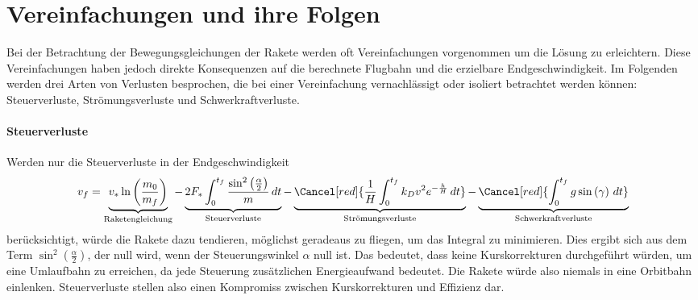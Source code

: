 %
%
%
%

\section{Vereinfachungen und ihre Folgen 
	\label{leo:section:vereinfachungen}}

Bei der Betrachtung der Bewegungsgleichungen der Rakete werden oft Vereinfachungen vorgenommen um die Lösung zu erleichtern. 
Diese Vereinfachungen haben jedoch direkte Konsequenzen auf die berechnete Flugbahn und die erzielbare Endgeschwindigkeit. 
Im Folgenden werden drei Arten von Verlusten besprochen, die bei einer Vereinfachung vernachlässigt oder isoliert betrachtet werden können: Steuerverluste, Strömungsverluste und Schwerkraftverluste.


\paragraph{Steuerverluste} Werden nur die Steuerverluste in der Endgeschwindigkeit
\begin{equation*}
	v_f = \underbrace{v_* \ln \left(\frac{m_0}{m_f}\right)}_{\text{Raketengleichung}} 
	- \underbrace{2F_* \int_0^{t_f} \frac{\sin^2\left(\frac{\alpha}{2}\right)}{m} \, dt }_{\text{Steuerverluste}}
	- \underbrace{\Cancel[red]{\frac{1}{H} \int_0^{t_f} k_Dv^2 e^{-\frac{h}{H}} \, dt }}_{\text{Strömungsverluste}}
	- \underbrace{\Cancel[red]{\int_0^{t_f} g \sin \left(\gamma\right) \, dt}}_{\text{Schwerkraftverluste}}
\end{equation*}
berücksichtigt, würde die Rakete dazu tendieren, möglichst geradeaus zu fliegen, um das Integral zu minimieren. 
Dies ergibt sich aus dem Term $\sin^2\left( \frac{\alpha}{2}\right)$, der null wird, wenn der Steuerungswinkel $\alpha$ null ist. 
Das bedeutet, dass keine Kurskorrekturen durchgeführt würden, um eine Umlaufbahn zu erreichen, da jede Steuerung zusätzlichen Energieaufwand bedeutet. 
Die Rakete würde also niemals in eine Orbitbahn einlenken.
Steuerverluste stellen also einen Kompromiss zwischen Kurskorrekturen und Effizienz dar.

